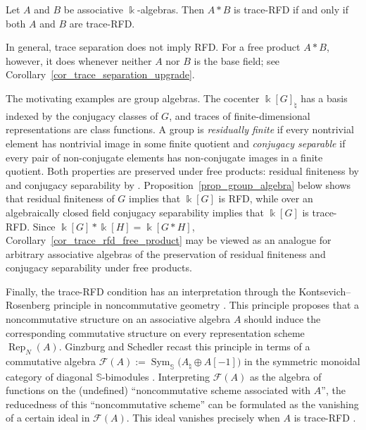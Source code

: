 \begin{corollary}\label{cor_trace_rfd_free_product}
    Let \(A\) and \(B\) be associative \(\Bbbk\)-algebras. Then \(A*B\) is trace-RFD if and only if both \(A\) and \(B\) are trace-RFD.
\end{corollary}

In general, trace separation does not imply RFD.
For a free product \(A*B\), however, it does whenever neither \(A\) nor \(B\) is the base field; see Corollary~\ref{cor_trace_separation_upgrade}.

The motivating examples are group algebras.
The cocenter \(\Bbbk[G]_{\natural}\) has a basis indexed by the conjugacy classes of \(G\), and traces of finite-dimensional representations are class functions.
A group is \emph{residually finite} if every nontrivial element has nontrivial image in some finite quotient and \emph{conjugacy separable} if every pair of non-conjugate elements has non-conjugate images in a finite quotient.
Both properties are preserved under free products: residual finiteness by \cite{Gruenberg1957} and conjugacy separability by \cite{Stebe1970,Remeslennikov1971}.
Proposition~\ref{prop_group_algebra} below shows that residual finiteness of \(G\) implies that \(\Bbbk[G]\) is RFD, while over an algebraically closed field conjugacy separability implies that \(\Bbbk[G]\) is trace-RFD.
Since \(\Bbbk[G]*\Bbbk[H]=\Bbbk[G*H]\), Corollary~\ref{cor_trace_rfd_free_product} may be viewed as an analogue for arbitrary associative algebras of the preservation of residual finiteness and conjugacy separability under free products.

Finally, the trace-RFD condition has an interpretation through the Kontsevich--Rosenberg principle in noncommutative geometry \cite{KontsevichRosenberg2000}.
This principle proposes that a noncommutative structure on an associative algebra \(A\) should induce the corresponding commutative structure on every representation scheme \(\operatorname{Rep}_N(A)\).
Ginzburg and Schedler recast this principle in terms of a commutative algebra \(\mathcal{F}(A):=\operatorname{Sym}_{\mathbb{S}}\bigl(A_{\natural}\oplus A[-1]\bigr)\) in the symmetric monoidal category of diagonal \(\mathbb{S}\)-bimodules \cite{GinzburgSchedler2010}.
Interpreting \(\mathcal{F}(A)\) as the algebra of functions on the (undefined) ``noncommutative scheme associated with \(A\)'', the reducedness of this ``noncommutative scheme'' can be formulated as the vanishing of a certain ideal in \(\mathcal{F}(A)\).
This ideal vanishes precisely when \(A\) is trace-RFD \cite{Safonkin2025DoubleStarProduct}.


